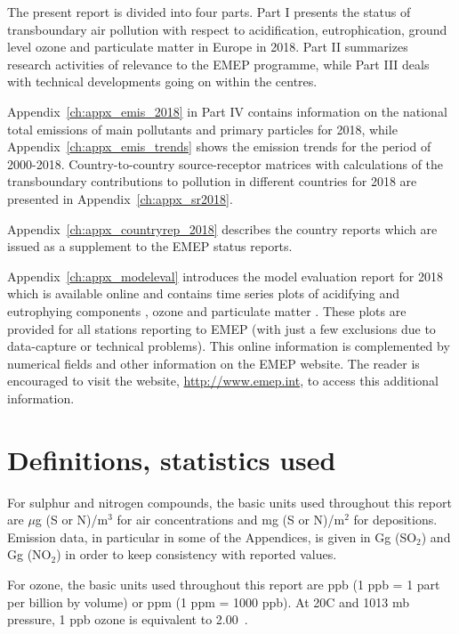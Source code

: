 The present report is divided into four parts. Part I presents the status
of transboundary air pollution with respect to acidification, eutrophication,
ground level ozone and particulate matter in Europe in 2018.
Part II summarizes research activities of relevance to the
EMEP programme, while Part III deals with technical developments going on within the centres.

Appendix~\ref{ch:appx_emis_2018} in Part IV contains information on the national total emissions of main pollutants and  primary particles for 2018, while Appendix~\ref{ch:appx_emis_trends} shows the  emission trends for the period of 2000-2018. Country-to-count\-ry source-receptor matrices with calculations of
the transboundary contributions to pollution in different countries
for 2018 are presented in Appendix~\ref{ch:appx_sr2018}.

Appendix~\ref{ch:appx_countryrep_2018} describes the country
reports which are  issued as a supplement to the EMEP status reports.

Appendix~\ref{ch:appx_modeleval} introduces the model evaluation
report for 2018 \citep{WEB2020:Eval} which is available online and contains time series plots
of acidifying and eutrophying components
\citep{WEB2020:SN}, ozone \citep{WEB2020:O3} and particulate matter \citep{WEB2020:PM}. These plots are provided for all stations reporting to
EMEP (with just a few exclusions due to data-capture or technical problems).
This online information is complemented by numerical fields and other
information on the EMEP website. The reader is encouraged to visit the
website, \url{http://www.emep.int}, to access this additional information.



\section{Definitions, statistics used}
\label{DEFS}

For sulphur and nitrogen compounds, the basic units used throughout
this report are $\mu$g (S or N)/m$^{3}$ for air concentrations and
mg (S or N)/m$^{2}$ for depositions. Emission data, in particular in
some of the Appendices, is given in Gg (SO$_2$)  and Gg (NO$_2$) in
order to keep consistency with reported values.

For ozone, the basic units used throughout this report are ppb (1 ppb
= 1 part per billion by volume) or ppm (1 ppm = 1000 ppb).  At
20\degrees C and 1013 mb pressure, 1 ppb ozone is equivalent to
2.00~\ug.  \vspace{0.5cm}

